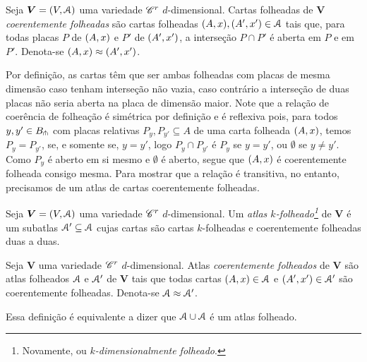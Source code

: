 \begin{definition}
Seja $\bm V = (V,\mathcal{A})$ uma variedade $\mathscr{C}^r$ $d$-dimensional. Cartas folheadas de $\bm V$ \emph{coerentemente folheadas} são cartas folheadas $(A,x), (A',x') \in \mathcal{A}$ tais que, para todas placas $P$ de $(A,x)$ e $P'$ de $(A',x')$, a interseção $P \cap P'$ é aberta em $P$ e em $P'$. Denota-se $(A,x) \approx (A',x')$.
\end{definition}

Por definição, as cartas têm que ser ambas folheadas com placas de mesma dimensão caso tenham interseção não vazia, caso contrário a interseção de duas placas não seria aberta na placa de dimensão maior. Note que a relação de coerência de folheação é simétrica por definição e é reflexiva pois, para todos $y,y' \in B_{\pitchfork}$ com placas relativas $P_y,P_{y'} \subseteq A$ de uma carta folheada $(A,x)$, temos $P_y = P_{y'}$, se, e somente se, $y=y'$, logo $P_y \cap P_{y'}$ é $P_y$ se $y=y'$, ou $\emptyset$ se $y \neq y'$. Como $P_y$ é aberto em si mesmo e $\emptyset$ é aberto, segue que $(A,x)$ é coerentemente folheada consigo mesma. Para mostrar que a relação é transitiva, no entanto, precisamos de um atlas de cartas coerentemente folheadas.

\begin{definition}
Seja $\bm V = (V,\mathcal{A})$ uma variedade $\mathscr{C}^r$ $d$-dimensional. Um \emph{atlas $k$-folheado\footnote{Novamente, ou \emph{$k$-dimensionalmente folheado}.}} de $\bm V$ é um subatlas $\mathcal{A}' \subseteq \mathcal{A}$ cujas cartas são cartas $k$-folheadas e coerentemente folheadas duas a duas.
\end{definition}

\begin{definition}
Seja $\bm V$ uma variedade $\mathscr{C}^r$ $d$-dimensional. Atlas \emph{coerentemente folheados} de $\bm V$ são atlas folheados $\mathcal{A}$ e $\mathcal{A}'$ de $\bm V$ tais que todas cartas $(A,x) \in \mathcal{A}$ e $(A',x') \in \mathcal{A}'$ são coerentemente folheadas. Denota-se $\mathcal{A} \approx \mathcal{A}'$.
\end{definition}

Essa definição é equivalente a dizer que $\mathcal{A} \cup \mathcal{A}$ é um atlas folheado.


